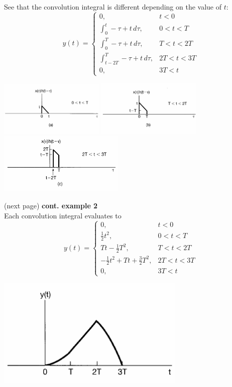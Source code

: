 \documentclass{report}
\begin{document}
See that the convolution integral is different depending on the value of $t$:
\begin{equation*}
y(t)=\begin{cases}
0,&t<0\\
\int^t_0-\tau+t\,d\tau,&0<t<T\\
\int^T_0-\tau+t\,d\tau,&T<t<2T\\
\int^T_{t-2T}-\tau+t\,d\tau,&2T<t<3T\\
0,&3T<t
\end{cases}
\end{equation*}
\begin{center}
\includegraphics[width=5cm]{a37}
\includegraphics[width=5cm]{a38}\\
\includegraphics[width=6cm]{a39}\\
\end{center}
(next page)\newpage
\noindent\textbf{cont. example 2}\\
Each convolution integral evaluates to
\begin{equation*}
y(t)=\begin{cases}
0,&t<0\\
\frac{1}{2}t^2,&0<t<T\\
Tt-\frac{1}{2}T^2,&T<t<2T\\
-\frac{1}{2}t^2+Tt+\frac{3}{2}T^2,&2T<t<3T\\
0,&3T<t
\end{cases}
\end{equation*}
\begin{center}
\includegraphics[width=9cm]{a40}
\end{center}
\end{document}
